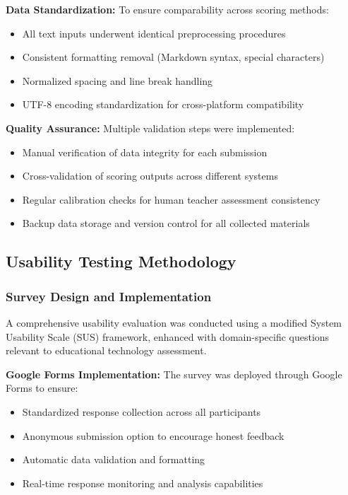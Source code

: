 {\textbf{Data Standardization:} To ensure comparability across scoring methods:
\begin{itemize}
    \item All text inputs underwent identical preprocessing procedures
    \item Consistent formatting removal (Markdown syntax, special characters)
    \item Normalized spacing and line break handling
    \item UTF-8 encoding standardization for cross-platform compatibility
\end{itemize}

\textbf{Quality Assurance:} Multiple validation steps were implemented:
\begin{itemize}
    \item Manual verification of data integrity for each submission
    \item Cross-validation of scoring outputs across different systems
    \item Regular calibration checks for human teacher assessment consistency
    \item Backup data storage and version control for all collected materials
\end{itemize}

\subsection{Usability Testing Methodology}

\subsubsection{Survey Design and Implementation}

A comprehensive usability evaluation was conducted using a modified System Usability Scale (SUS) framework, enhanced with domain-specific questions relevant to educational technology assessment.

\textbf{Google Forms Implementation:} The survey was deployed through Google Forms to ensure:
\begin{itemize}
    \item Standardized response collection across all participants
    \item Anonymous submission option to encourage honest feedback
    \item Automatic data validation and formatting
    \item Real-time response monitoring and analysis capabilities
\end{itemize}

}
